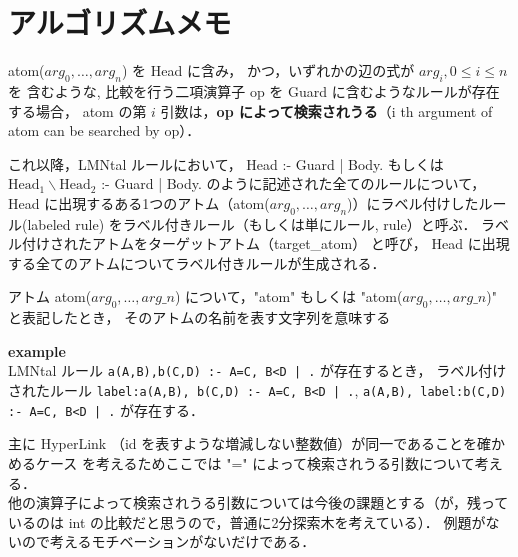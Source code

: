 \section{アルゴリズムメモ}

\algnewcommand{}
\algnewcommand\Def{\item[\algorithmicinput]}

\begin{definition}[検索されうる引数]
atom($arg_0, \dots, arg_n$) を Head に含み，
かつ，いずれかの辺の式が $arg_i, 0\leq i\leq n$ を
含むような, 比較を行う二項演算子 op を Guard に含むようなルールが存在する場合，
atom の第 $i$ 引数は，\textbf{op によって検索されうる}（i th argument of atom can be searched by op）．
\end{definition}

\begin{definition}
これ以降，LMNtal ルールにおいて，
Head :- Guard | Body. もしくは $\text{Head}_1 \backslash \text{Head}_2$ :- Guard | Body.
のように記述された全てのルールについて，
Head に出現するある1つのアトム（atom($arg_0,\dots, arg_n$)）にラベル付けしたルール(labeled rule) をラベル付きルール（もしくは単にルール, rule）と呼ぶ．
ラベル付けされたアトムをターゲットアトム（target\_atom） と呼び，
Head に出現する全てのアトムについてラベル付きルールが生成される．
\end{definition}

\begin{definition}
    アトム atom($arg_0,\dots, arg\_n$) について，"atom" もしくは "atom($arg_0,\dots, arg\_n$)" と表記したとき，
    そのアトムの名前を表す文字列を意味する
\end{definition}

\textbf{example}\\
    LMNtal ルール
    \texttt{a(A,B),b(C,D) :- A=C, B<D | .}
    が存在するとき，
    ラベル付けされたルール
    \texttt{label:a(A,B), b(C,D) :- A=C, B<D | .},
    \texttt{a(A,B), label:b(C,D) :- A=C, B<D | .}
    が存在する．



主に HyperLink （id を表すような増減しない整数値）が同一であることを確かめるケース
を考えるためここでは "=" によって検索されうる引数について考える．\\
他の演算子によって検索されうる引数については今後の課題とする（が，残っているのは int の比較だと思うので，普通に2分探索木を考えている）．
例題がないので考えるモチベーションがないだけである．


